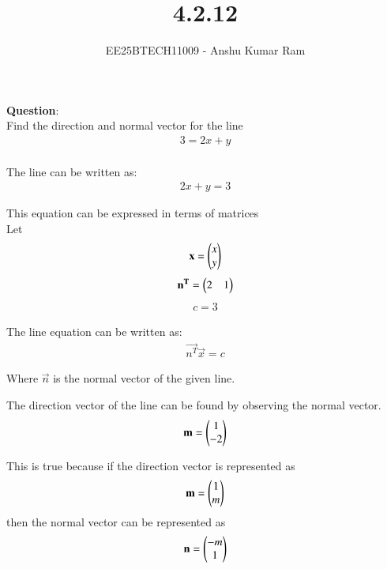 \documentclass[journal]{IEEEtran}
\begin{document}

\vspace{3cm}

\title{4.2.12}
\author{EE25BTECH11009 - Anshu Kumar Ram }
\maketitle
{\let\newpage\relax\maketitle}

\renewcommand{\thefigure}{\theenumi}
\renewcommand{\thetable}{\theenumi}
\setlength{\intextsep}{10pt} %


\renewcommand{\thetable}{\theenumi}


\textbf{Question}:\\
Find the direction and normal vector for the line 
\begin{align}
3 = 2x + y
\end{align}
\solution \\

The line can be written as: 
\begin{align}
2x + y = 3
\end{align}

This equation can be expressed in terms of matrices\\
Let
\begin{align}
\mathbf{x} = \begin{pmatrix}x \\ y\end{pmatrix}
\end{align}
\begin{align}
\mathbf{n^T} = \begin{pmatrix}2 & 1\end{pmatrix}
\end{align}
\begin{align}
c = 3
\end{align}

The line equation can be written as:
\begin{align}
\vec{n^T}  \vec{x} = c
\end{align}

Where $\vec{n}$ is the normal vector of the given line.

The direction vector of the line can be found by observing the normal vector.
\begin{align}
\mathbf{m} = \begin{pmatrix}1 \\ -2\end{pmatrix}
\end{align}

This is true because if the direction vector is represented as 
\begin{align}
\mathbf{m}  = \begin{pmatrix}1 \\ m\end{pmatrix}    
\end{align}
then the normal vector can be represented as 
\begin{align}
\mathbf{n} = \begin{pmatrix}-m \\ 1\end{pmatrix}
\end{align}
\end{document}
